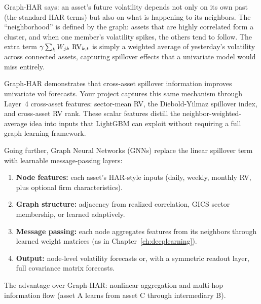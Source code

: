 \begin{intuition}
Graph-HAR says: an asset's future volatility depends not only on its own past
(the standard HAR terms) but also on what is happening to its neighbors. The
``neighborhood'' is defined by the graph: assets that are highly correlated form
a cluster, and when one member's volatility spikes, the others tend to follow.
The extra term $\gamma \sum_k W_{jk}\,\operatorname{RV}_{k,t}$ is simply a weighted average
of yesterday's volatility across connected assets, capturing spillover effects
that a univariate model would miss entirely.
\end{intuition}

\begin{projectconnection}
Graph-HAR demonstrates that cross-asset spillover information improves univariate
vol forecasts.  Your project captures this same mechanism through Layer~4
cross-asset features: sector-mean RV, the Diebold-Yilmaz spillover index, and
cross-asset RV rank.  These scalar features distill the neighbor-weighted-average
idea into inputs that LightGBM can exploit without requiring a full graph
learning framework.
\end{projectconnection}

\begin{keyidea}
Going further, Graph Neural Networks (GNNs) replace the linear spillover term
with learnable message-passing layers:
\begin{enumerate}[nosep]
  \item \textbf{Node features:} each asset's HAR-style inputs (daily, weekly,
        monthly RV, plus optional firm characteristics).
  \item \textbf{Graph structure:} adjacency from realized correlation, GICS
        sector membership, or learned adaptively.
  \item \textbf{Message passing:} each node aggregates features from its
        neighbors through learned weight matrices (as in Chapter~\ref{ch:deeplearning}).
  \item \textbf{Output:} node-level volatility forecasts or, with a symmetric
        readout layer, full covariance matrix forecasts.
\end{enumerate}
The advantage over Graph-HAR: nonlinear aggregation and multi-hop
information flow (asset A learns from asset C through intermediary B).
\end{keyidea}

